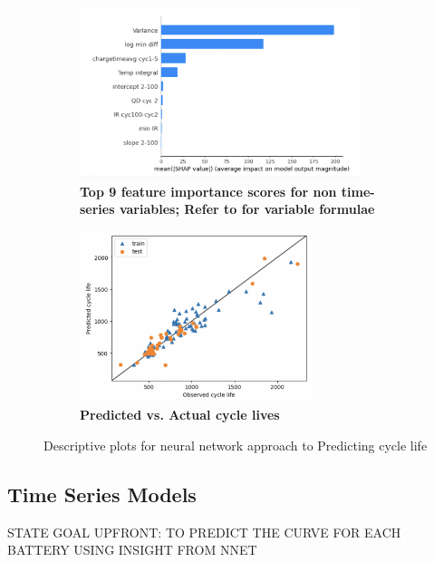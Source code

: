 \documentclass{article}
\begin{document}
\begin{figure}[H]
     \centering
     \begin{subfigure}[b]{0.5\textwidth}
         \centering
         \includegraphics[width=\textwidth,height = 5cm]{figs/shap.png}
         \caption{\textbf{Top 9 feature importance scores for non time-series variables; Refer to \cite{severson2019data} for variable formulae}}
         \label{fig:y equals x}
     \end{subfigure}
     \hfill
     \begin{subfigure}[b]{0.49\textwidth}
         \centering
         \includegraphics[width=\textwidth,height = 5cm]{figs/obspred.png}
         \caption{\textbf{Predicted vs. Actual cycle lives}}
         \label{fig:three sin x}
     \end{subfigure}
\caption{Descriptive plots for neural network approach to Predicting cycle life}
\label{fig:birds}
\end{figure} 

\subsection{Time Series Models}
STATE GOAL UPFRONT: TO PREDICT THE CURVE FOR EACH BATTERY USING INSIGHT FROM NNET 
\end{document}
